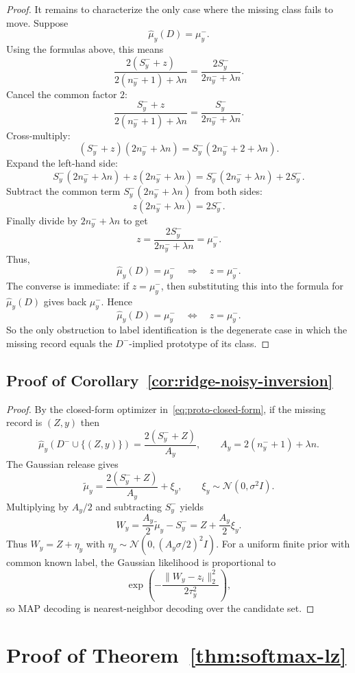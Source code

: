 \documentclass[conference,compsoc]{IEEEtran}
\begin{document}
\begin{proof}
It remains to characterize the only case where the missing class fails to move. Suppose
\[
\widehat\mu_y(D)=\mu_y^-.
\]
Using the formulas above, this means
\[
\frac{2(S_y^-+z)}{2(n_y^-+1)+\lambda n}
=
\frac{2S_y^-}{2n_y^-+\lambda n}.
\]
Cancel the common factor $2$:
\[
\frac{S_y^-+z}{2(n_y^-+1)+\lambda n}
=
\frac{S_y^-}{2n_y^-+\lambda n}.
\]
Cross-multiply:
\[
(S_y^-+z)(2n_y^-+\lambda n)
=
S_y^-(2n_y^-+2+\lambda n).
\]
Expand the left-hand side:
\[
S_y^-(2n_y^-+\lambda n)+z(2n_y^-+\lambda n)
=
S_y^-(2n_y^-+\lambda n)+2S_y^-.
\]
Subtract the common term $S_y^-(2n_y^-+\lambda n)$ from both sides:
\[
z(2n_y^-+\lambda n)=2S_y^-.
\]
Finally divide by $2n_y^-+\lambda n$ to get
\[
z=\frac{2S_y^-}{2n_y^-+\lambda n}=\mu_y^-.
\]
Thus,
\[
\widehat\mu_y(D)=\mu_y^- \quad \Longrightarrow \quad z=\mu_y^-.
\]
The converse is immediate: if $z=\mu_y^-$, then substituting this into the formula for $\widehat\mu_y(D)$ gives back $\mu_y^-$. Hence
\[
\widehat\mu_y(D)=\mu_y^- \quad \Longleftrightarrow \quad z=\mu_y^-.
\]
So the only obstruction to label identification is the degenerate case in which the missing record equals the $D^-$-implied prototype of its class.
\end{proof}

\subsection{Proof of Corollary~\ref{cor:ridge-noisy-inversion}}

\begin{proof}
By the closed-form optimizer in~\eqref{eq:proto-closed-form}, if the missing record is $(Z,y)$ then
\[
\widehat\mu_y(D^-\cup\{(Z,y)\})=\frac{2(S_y^-+Z)}{A_y},
\qquad
A_y=2(n_y^-+1)+\lambda n.
\]
The Gaussian release gives
\[
\widetilde\mu_y=\frac{2(S_y^-+Z)}{A_y}+\xi_y,
\qquad
\xi_y\sim\mathcal N(0,\sigma^2 I).
\]
Multiplying by $A_y/2$ and subtracting $S_y^-$ yields
\[
W_y=\frac{A_y}{2}\widetilde\mu_y-S_y^-
=Z+\frac{A_y}{2}\xi_y.
\]
Thus $W_y=Z+\eta_y$ with $\eta_y\sim\mathcal N(0,(A_y\sigma/2)^2I)$.
For a uniform finite prior with common known label, the Gaussian likelihood is proportional to
\[
\exp\!\left(-\frac{\|W_y-z_i\|_2^2}{2\tau_y^2}\right),
\]
so MAP decoding is nearest-neighbor decoding over the candidate set.
\end{proof}


\section{Proof of Theorem~\ref{thm:softmax-lz}}
\label{app:proof-softmax}
\end{document}
